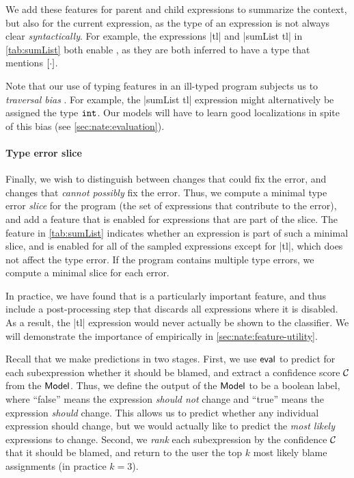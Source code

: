 We add these features for parent and child expressions to summarize the
context, but also for the current expression, as the type of an
expression is not always clear \emph{syntactically}.
%
For example, the expressions |tl| and |sumList tl|
in \autoref{tab:sumList} both enable \HasTypeList, as they
are both inferred to have a type that mentions $[\cdot]$.

Note that our use of typing features in an ill-typed program subjects us
to \emph{traversal bias} \citep{McAdam1998-ub}. For example, the
|sumList tl| expression might alternatively be assigned the type
$\mathtt{int}$.
%
Our models will have to learn good localizations in spite of this bias (see
\autoref{sec:nate:evaluation}).

\paragraph{Type error slice}
Finally, we wish to distinguish between changes that could fix the
error, and changes that \emph{cannot possibly} fix the error.
%
Thus, we compute a minimal type error \emph{slice} for the program
(\ie the set of expressions that contribute to the error), and add a
feature that is enabled for expressions that are part of the slice.
%
The \InSlice feature in \autoref{tab:sumList} indicates whether an
expression is part of such a minimal slice, and is enabled for all of
the sampled expressions except for |tl|, which does not affect
the type error.
%
If the program contains multiple type errors, we compute
a minimal slice for each error.

In practice, we have found that \InSlice is a particularly important
feature, and thus include a post-processing step that discards all
expressions where it is disabled.
%
As a result, the |tl| expression would never actually be shown to the
classifier.
%
 We will demonstrate the importance of \InSlice empirically in
\autoref{sec:nate:feature-utility}.

\label{sec:nate:labels}
Recall that we make predictions in two stages.
%
First, we use $\mathsf{eval}$ to predict for each subexpression whether it
should be blamed, and extract a confidence score $\mathcal{C}$ from the
$\mathsf{Model}$.
%
Thus, we define the output of the $\mathsf{Model}$ to be a boolean label, where
``false'' means the expression \emph{should not} change and ``true''
means the expression \emph{should} change.
%
This allows us to predict whether any individual expression should
change, but we would actually like to predict the \emph{most likely}
expressions to change.
%
Second, we \emph{rank} each subexpression by the confidence $\mathcal{C}$
that it should be blamed, and return to the user the top $k$
most likely blame assignments (in practice $k=3$).

